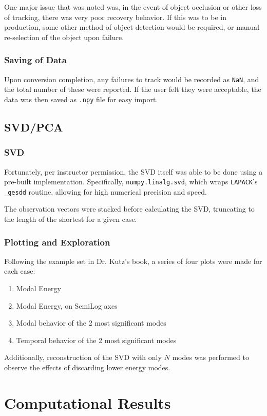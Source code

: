 \documentclass[journal]{IEEEtran}
\def\code#1{\texttt{#1}}
\begin{document}
One major issue that was noted was, in the event of object occlusion or other loss of tracking,
there was very poor recovery behavior. If this was to be in production, some other method of object
detection would be required, or manual re-selection of the object upon failure.

\subsubsection{Saving of Data}
Upon conversion completion, any failures to track would be recorded as \code{NaN}, and the total
number of these were reported. If the user felt they were acceptable, the data was then saved as
\code{.npy} file for easy import.

\subsection{SVD/PCA}

\subsubsection{SVD}
Fortunately, per instructor permission, the SVD itself was able to be done using a pre-built
implementation. Specifically, \code{numpy.linalg.svd}, which wraps \code{LAPACK}'s \code{\_gesdd}
routine, allowing for high numerical precision and speed.

The observation vectors were stacked before calculating the SVD, truncating to the length of the
shortest for a given case.

\subsubsection{Plotting and Exploration}
Following the example set in Dr. Kutz's book, a series of four plots were made for each case:
\begin{enumerate}
	\item Modal Energy
	\item Modal Energy, on SemiLog axes
	\item Modal behavior of the 2 most significant modes
	\item Temporal behavior of the 2 most significant modes
\end{enumerate}

Additionally, reconstruction of the SVD with only $N$ modes was performed to observe the effects of
discarding lower energy modes.


\section{Computational Results}
\end{document}
